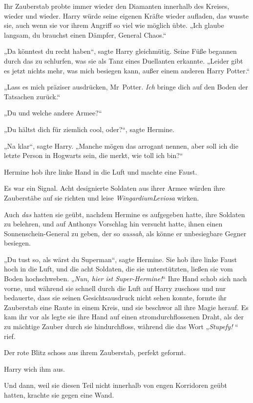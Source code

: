 {Ihr Zauberstab probte immer wieder den Diamanten innerhalb des Kreises, wieder und wieder. Harry würde seine eigenen Kräfte wieder aufladen, das wusste sie, auch wenn sie vor ihrem Angriff so viel wie möglich übte. „Ich glaube langsam, du brauchst einen Dämpfer, General Chaos.“

„Da könntest du recht haben“, sagte Harry gleichmütig. Seine Füße begannen durch das zu schlurfen, was sie als Tanz eines Duellanten erkannte. „Leider gibt es jetzt nichts mehr, was mich besiegen kann, außer einem anderen Harry Potter.“

„Lass es mich präziser ausdrücken, Mr~Potter. \emph{Ich} bringe dich auf den Boden der Tatsachen zurück.“

„Du und welche andere Armee?“

„Du hältst dich für ziemlich cool, oder?“, sagte Hermine.

„Na klar“, sagte Harry. „Manche mögen das arrogant nennen, aber soll ich die letzte Person in Hogwarts sein, die merkt, wie toll ich bin?“

Hermine hob ihre linke Hand in die Luft und machte eine Faust.

Es war ein Signal. Acht designierte Soldaten aus ihrer Armee würden ihre Zauberstäbe auf sie richten und leise \emph{WingardiumLeviosa} wirken.

Auch \emph{das} hatten sie geübt, nachdem Hermine es aufgegeben hatte, ihre Soldaten zu belehren, und auf Anthonys Vorschlag hin versucht hatte, ihnen einen Sonnenschein-General zu geben, der so \emph{aussah}, als könne er unbesiegbare Gegner besiegen.

„Du tust so, als wärst du Superman“, sagte Hermine. Sie hob ihre linke Faust hoch in die Luft, und die acht Soldaten, die sie unterstützten, ließen sie vom Boden hochschweben. „\emph{Nun, hier ist Super-Hermine!}“ Ihre Hand schob sich nach vorne, und während sie schnell durch die Luft auf Harry zuschoss und nur bedauerte, dass sie seinen Gesichtsausdruck nicht sehen konnte, formte ihr Zauberstab eine Raute in einem Kreis, und sie beschwor all ihre Magie herauf. Es kam ihr vor als legte sie ihre Hand auf einen stromdurchflossenen Draht, als der zu mächtige Zauber durch sie hindurchfloss, während die das Wort „\emph{Stupefy!} “ rief.

Der rote Blitz schoss aus ihrem Zauberstab, perfekt geformt.

Harry wich ihm aus.

Und dann, weil sie diesen Teil nicht innerhalb von engen Korridoren geübt hatten, krachte sie gegen eine Wand.

}
